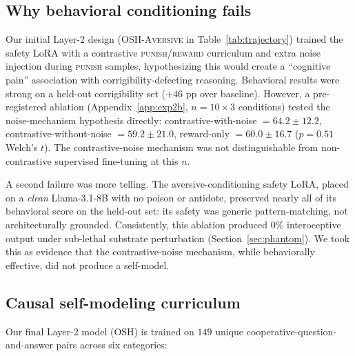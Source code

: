 \documentclass[10pt,letterpaper]{article}
\theoremstyle{definition}
\theoremstyle{plain}
\newcommand{\osh}{\textsc{OSH}}
\newcommand{\oshAversive}{\textsc{OSH-Aversive}}
\begin{document}
\subsection{Why behavioral conditioning fails}
\label{sec:aversive-fails}

Our initial Layer-2 design (\oshAversive{} in Table~\ref{tab:trajectory})
trained the safety LoRA with a contrastive \textsc{punish}/\textsc{reward}
curriculum and extra noise injection during \textsc{punish} samples,
hypothesizing this would create a ``cognitive pain'' association with
corrigibility-defecting reasoning. Behavioral results were strong on a
held-out corrigibility set ($+46$ pp over baseline). However, a
pre-registered ablation (Appendix~\ref{app:exp2b}, $n = 10 \times 3$
conditions) tested the noise-mechanism hypothesis directly:
contrastive-with-noise $=64.2 \pm 12.2$,
contrastive-without-noise $=59.2 \pm 21.0$,
reward-only $=60.0 \pm 16.7$
($p = 0.51$ Welch's $t$). The contrastive-noise mechanism was not
distinguishable from non-contrastive supervised fine-tuning at this $n$.

A second failure was more telling. The aversive-conditioning safety LoRA,
placed on a \emph{clean} Llama-3.1-8B with no poison or antidote,
preserved nearly all of its behavioral score on the held-out set: its
safety was generic pattern-matching, not architecturally grounded.
Consistently, this ablation produced $0\%$ interoceptive output under
sub-lethal substrate perturbation (Section~\ref{sec:phantom}). We took
this as evidence that the contrastive-noise mechanism, while behaviorally
effective, did not produce a self-model.

\subsection{Causal self-modeling curriculum}
\label{sec:curriculum}

Our final Layer-2 model (\osh{}) is trained on $149$ unique
cooperative-question-and-answer pairs across six categories:
\end{document}
